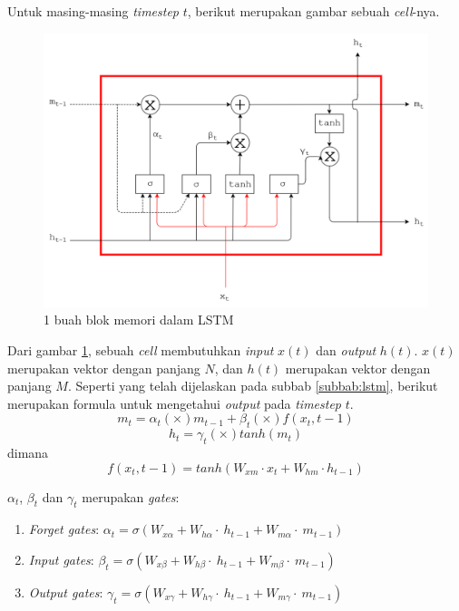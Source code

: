 \begin{enumerate}
	Untuk masing-masing \textit{timestep} $ t $, berikut merupakan gambar sebuah \textit{cell}-nya.
	\begin{figure}
		\centering
		\includegraphics[width=0.85\linewidth]{images/lstm}
		\caption{1 buah blok memori dalam LSTM}
		\label{fig:lstm1cell}
	\end{figure}
	
	Dari gambar \ref{fig:lstm1cell}, sebuah \textit{cell} membutuhkan \textit{input} $ x(t) $ dan \textit{output} $ h(t) $. $ x(t) $ merupakan vektor dengan panjang $ N $, dan $ h(t) $ merupakan vektor dengan panjang $ M $. Seperti yang telah dijelaskan pada subbab \ref{subbab:lstm}, berikut merupakan formula untuk mengetahui \textit{output} pada \textit{timestep} $ t $.
	\begin{equation}\label{eq:lstmm}
	m_{t}=\alpha_{t} (\times) m_{t-1} + \beta_{t} (\times) f(x_{t},{t-1})
	\end{equation}
	\begin{equation}\label{eq:lstmh}
	h_{t}=\gamma_{t} (\times) tanh(m_{t})
	\end{equation}
	dimana
	\begin{equation}\label{eq:lstmx}
	f(x_{t},{t-1})=tanh(W_{xm} \cdot x_{t} + W_{hm} \cdot h_{t-1})
	\end{equation}
	
	$ \alpha_t $, $ \beta_t $ dan $ \gamma_t $ merupakan \textit{gates}:
	\begin{enumerate}
		\item \textit{Forget gates}: $ \alpha_{t}=\sigma(W_{x\alpha}+W_{h\alpha}\cdot~h_{t-1}+W_{m\alpha}\cdot~m_{t-1}) $
		\item \textit{Input gates}: $ \beta_{t}=\sigma(W_{x\beta}+W_{h\beta}\cdot~h_{t-1}+W_{m\beta}\cdot~m_{t-1}) $
		\item \textit{Output gates}: $ \gamma_{t}=\sigma(W_{x\gamma}+W_{h\gamma}\cdot~h_{t-1}+W_{m\gamma}\cdot~m_{t-1}) $
	\end{enumerate}


\end{enumerate}
